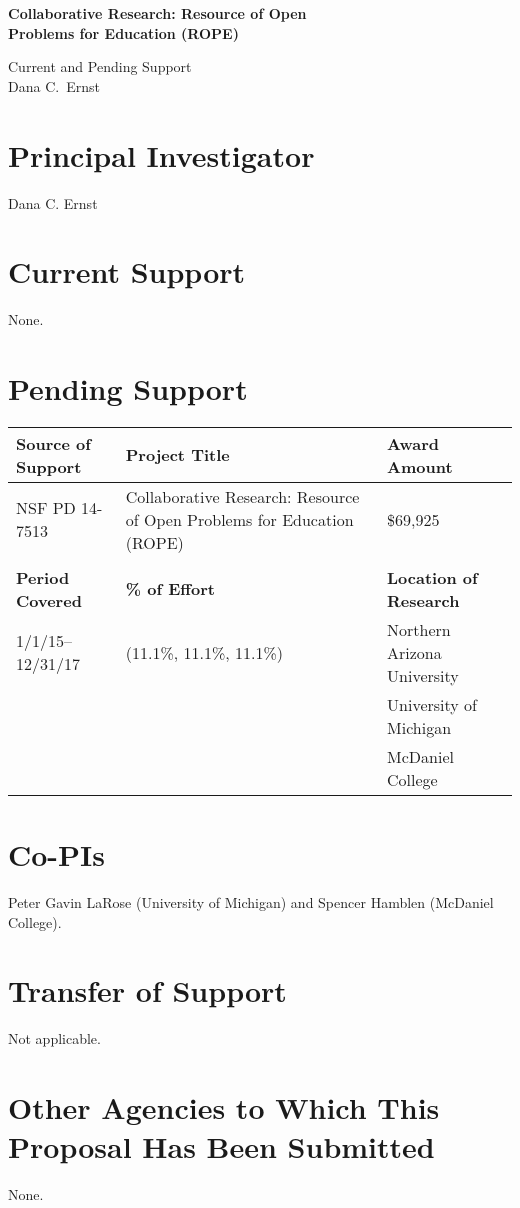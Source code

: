 \documentclass[11pt]{article}
\begin{document}
\begin{center}
{\Large \textbf{Collaborative Research: Resource of Open\\
Problems for Education (ROPE)}}

\bigskip

{\Large Current and Pending Support}\\
\smallskip
Dana C.~Ernst
\end{center}

\thispagestyle{empty}

\section{Principal Investigator}

\noindent Dana C. Ernst

\section{Current Support}

\noindent None.

\section{Pending Support}

\begin{tabularx}{6.4in}{@{}lXl}
\hline
\textbf{Source of Support} & \textbf{Project Title} & \textbf{Award Amount} \\
\hline
NSF PD 14-7513 & Collaborative Research: Resource of Open Problems for Education (ROPE) & \$69,925\\
\\
\hline
\textbf{Period Covered} & \textbf{\% of Effort} & \textbf{Location of Research} \\
\hline
1/1/15--12/31/17 \ \ & (11.1\%, 11.1\%, 11.1\%) \ & Northern Arizona University \\ 
&& University of Michigan \\
&& McDaniel College\\
\end{tabularx}

\section{Co-PIs}

\noindent Peter Gavin LaRose (University of Michigan) and Spencer Hamblen (McDaniel College).

\section{Transfer of Support}

\noindent Not applicable.

\section{Other Agencies to Which This Proposal Has Been Submitted}

None.
\end{document}
